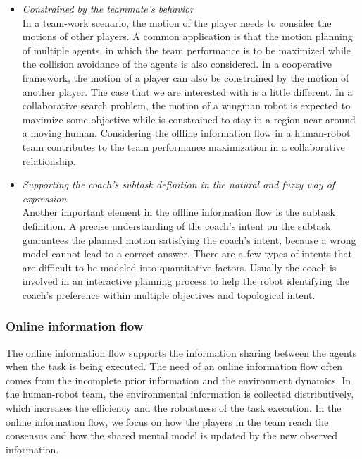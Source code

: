 \documentclass[phd]{byuprop}
\begin{document}
\begin{itemize}
\item {\em Constrained by the teammate's behavior} \\
In a team-work scenario, the motion of the player needs to consider the motions of other players.
A common application is that the motion planning of multiple agents, in which the team performance is to be maximized while the collision avoidance of the agents is also considered.
In a cooperative framework, the motion of a player can also be constrained by the motion of another player. 
The case that we are interested with is a little different.
In a collaborative search problem, the motion of a wingman robot is expected to maximize some objective while is constrained to stay in a region near around a moving human.
Considering the offline information flow in a human-robot team contributes to the team performance maximization in a collaborative relationship.
	
\item {\em Supporting the coach's subtask definition in the natural and fuzzy way of expression} \\
Another important element in the offline information flow is the subtask definition.
A precise understanding of the coach's intent on the subtask guarantees the planned motion satisfying the coach's intent, because a wrong model cannot lead to a correct answer.
There are a few types of intents that are difficult to be modeled into quantitative factors.
Usually the coach is involved in an interactive planning process to help the robot identifying the coach's preference within multiple objectives and topological intent.
\end{itemize}

\subsubsection{Online information flow}

The online information flow supports the information sharing between the agents when the task is being executed.
The need of an online information flow often comes from the incomplete prior information and the environment dynamics.
In the human-robot team, the environmental information is collected distributively, which increases the efficiency and the robustness of the task execution.
In the online information flow, we focus on how the players in the team reach the consensus and how the shared mental model is updated by the new observed information.
\end{document}
